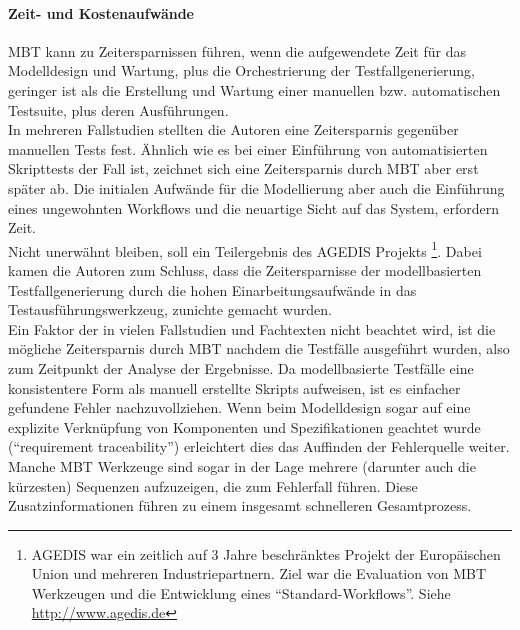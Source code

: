 \paragraph{Zeit- und Kostenaufwände} \Gls{MBT} kann zu Zeitersparnissen führen, wenn die aufgewendete Zeit für das Modelldesign und Wartung, plus die Orchestrierung der Testfallgenerierung, geringer ist als die Erstellung und Wartung einer manuellen bzw. automatischen Testsuite, plus deren Ausführungen.\\
In mehreren Fallstudien stellten die Autoren eine Zeitersparnis gegenüber manuellen Tests fest\cite{farchi_using_2002}\cite{prenninger_mbt_2005}\cite{pretschner_one_2005}. Ähnlich wie es bei einer Einführung von automatisierten Skripttests der Fall ist, zeichnet sich eine Zeitersparnis durch \Gls{MBT} aber erst später ab. Die initialen Aufwände für die Modellierung aber auch die Einführung eines ungewohnten Workflows und die neuartige Sicht auf das System, erfordern Zeit.\\
Nicht unerwähnt bleiben, soll ein Teilergebnis des AGEDIS Projekts \footnote{AGEDIS war ein zeitlich auf 3 Jahre beschränktes Projekt der Europäischen Union und mehreren Industriepartnern. Ziel war die Evaluation von \Gls{MBT} Werkzeugen und die Entwicklung eines ``Standard-Workflows''. Siehe \url{http://www.agedis.de}}. Dabei kamen die Autoren zum Schluss, dass die Zeitersparnisse der modellbasierten Testfallgenerierung durch die hohen Einarbeitungsaufwände in das Testausführungswerkzeug, zunichte gemacht wurden\cite{craggs_agedis_2003}.\\
Ein Faktor der in vielen Fallstudien und Fachtexten nicht beachtet wird, ist die mögliche Zeitersparnis durch \Gls{MBT} nachdem die Testfälle ausgeführt wurden, also zum Zeitpunkt der Analyse der Ergebnisse. Da modellbasierte Testfälle eine konsistentere Form als manuell erstellte Skripts aufweisen, ist es einfacher gefundene Fehler nachzuvollziehen. Wenn beim Modelldesign sogar auf eine explizite Verknüpfung von Komponenten und Spezifikationen geachtet wurde (``requirement traceability'') erleichtert dies das Auffinden der Fehlerquelle weiter. Manche \Gls{MBT} Werkzeuge sind sogar in der Lage mehrere (darunter auch die kürzesten) Sequenzen aufzuzeigen, die zum Fehlerfall führen. Diese Zusatzinformationen führen zu einem insgesamt schnelleren Gesamtprozess\cite{utting_practical_2007}.

